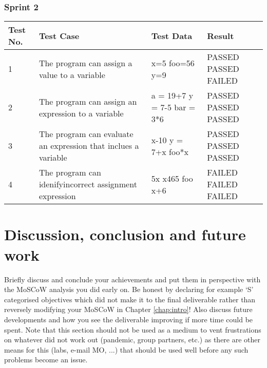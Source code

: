 \documentclass[a4paper, oneside, 11pt]{report}
\begin{document}
\subsection{Sprint 2}

\begin{tabular}{|p{8mm}|p{60mm}|p{30mm}|p{15mm}|}Test No. & Test Case & Test Data & Result \\ \hline
1 & The program can assign a value to a variable & x=5 \newline foo=56 \newline y=9  &  PASSED \newline PASSED \newline FAILED \\
2 & The program can assign an expression to a variable & a = 19+7 \newline y = 7-5 \newline bar = 3*6  &  PASSED \newline PASSED \newline PASSED \\
3 & The program can evaluate an expression that inclues a variable & x-10 \newline y = 7+x \newline foo*x  &  PASSED \newline PASSED \newline PASSED \\
4 & The program can idenifyincorrect assignment expression & 5x \newline x465 \newline foo x+6  &  FAILED \newline FAILED \newline FAILED \\
\end{tabular}

\chapter{Discussion, conclusion and future work}

Briefly discuss and conclude your achievements and put them in perspective with the MoSCoW analysis you did early on. Be honest by declaring for example `S' categorised objectives which did not make it to the final deliverable rather than reversely modifying your MoSCoW in Chapter \ref{chap:intro}! Also discuss future developments and how you see the deliverable improving if more time could be spent. Note that this section should not be used as a medium to vent frustrations on whatever did not work out (pandemic, group partners, etc.) as there are other means for this (labs, e-mail MO, ...) that should be used well before any such problems become an issue.
\end{document}
